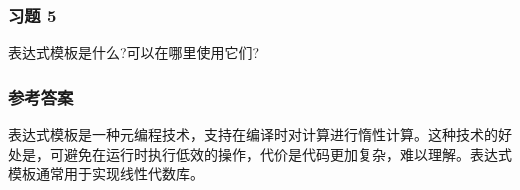 \subsubsection{习题 5}

表达式模板是什么?可以在哪里使用它们?

\subsubsection{参考答案}

表达式模板是一种元编程技术，支持在编译时对计算进行惰性计算。这种技术的好处是，可避免在运行时执行低效的操作，代价是代码更加复杂，难以理解。表达式模板通常用于实现线性代数库。












